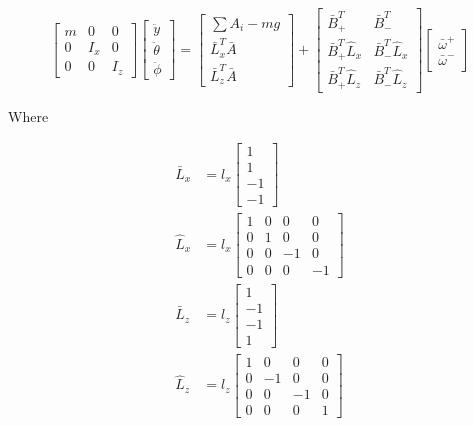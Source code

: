 \documentclass{article}
\begin{document}
\begin{equation}
	\begin{bmatrix} m & 0 & 0 \\ 0 & I_{x} & 0 \\ 0 & 0 & I_{z} \end{bmatrix} 
	\begin{bmatrix} \ddot{y} \\ \ddot{\theta} \\ \ddot{\phi} \end{bmatrix} = 
	\begin{bmatrix} \sum A_i - mg \\ \bar{L}_x^T \bar{A} \\ \bar{L}_z^T \bar{A} \end{bmatrix} +
	\begin{bmatrix} \bar{B}_+^T & \bar{B}_-^T \\ \bar{B}_+^T \hat{L}_x & \bar{B}_-^T \hat{L}_x \\ \bar{B}_+^T \hat{L}_z & \bar{B}_-^T \hat{L}_z \end{bmatrix} 
	\begin{bmatrix} \bar{\omega}^+ \\ \bar{\omega}^- \end{bmatrix}
	\label{eq:Newton-Euler}
\end{equation}

Where 

\begin{align}
	\bar{L}_x &= l_x \begin{bmatrix} 1 \\ 1 \\ -1 \\ -1 \end{bmatrix} \\
	\hat{L}_x &= l_x \begin{bmatrix} 1 & 0 & 0 & 0\\ 0 & 1 & 0 & 0 \\ 0 & 0 & -1 & 0\\ 0 & 0 & 0 & -1 \end{bmatrix} \\
	\bar{L}_z &= l_z \begin{bmatrix} 1 \\ -1 \\ -1 \\ 1 \end{bmatrix} \\
	\hat{L}_z &= l_z \begin{bmatrix} 1 & 0 & 0 & 0\\ 0 & -1 & 0 & 0 \\ 0 & 0 & -1 & 0\\ 0 & 0 & 0 & 1 \end{bmatrix}
\end{align}
\end{document}
